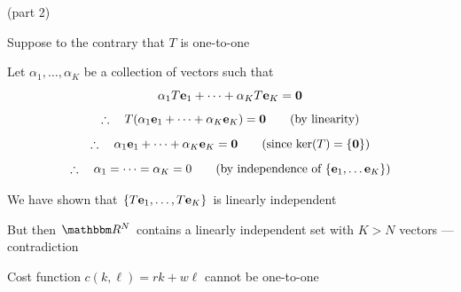 \begin{frame}
    
    \Prf(part 2)
    
    Suppose to the contrary that $T$ is one-to-one

    Let $\alpha_1, \ldots, \alpha_K$ be a collection of vectors such that 
    \[
    \alpha_1 T {\mathbf e}_1 + \cdots + \alpha_K T {\mathbf e}_K = {\mathbf 0}
    \]
    \[
    \therefore \quad 
    T (\alpha_1 {\mathbf e}_1 + \cdots + \alpha_K {\mathbf e}_K) = {\mathbf 0}
    \qquad (\text{by linearity})
    \]
    \[
    \therefore \quad
    \alpha_1 {\mathbf e}_1 + \cdots + \alpha_K {\mathbf e}_K = {\mathbf 0}
    \qquad (\text{since $\ker(T) = \{{\mathbf 0}\}$})
    \]
    \[
    \therefore \quad 
    \alpha_1 = \cdots = \alpha_K = 0
    \qquad (\text{by independence of $\{{\mathbf e}_1, \ldots {\mathbf e}_K\}$)}
    \]

    We have shown that $\{T{\mathbf e}_1, \ldots, T{\mathbf e}_K\}$ is linearly
    independent

    But then $\RR^N$ contains a linearly independent set
    with $K > N$ vectors --- contradiction

\end{frame}


\begin{frame}
    
    \begin{figure}
       \begin{center}
       \end{center}
    \end{figure}

   \Eg Cost function $c(k, \ell) = rk + w\ell$ cannot be one-to-one

\end{frame}

